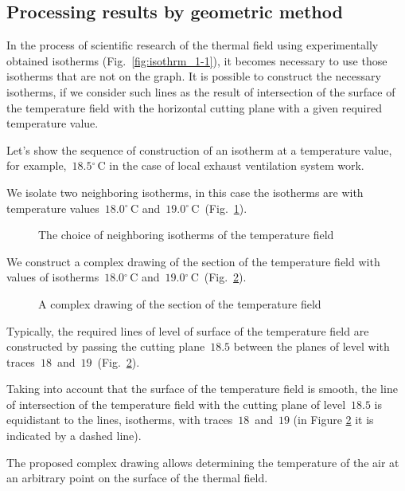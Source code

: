 \documentclass[12pt,twoside]{article}
\newcommand{\FigRef}[2][]{(Fig.~\ref{#2}\textit{#1})}
\newcommand{\degC}{{}^{\circ}\,\text{C}} %
\begin{document}
\begin{JGGarticle}
		\section{Processing results by geometric method}
			In the process of scientific research of the thermal field using experimentally obtained isotherms \FigRef{fig:isothrm_1-1}, it becomes necessary to use those isotherms that are not on the graph. It is possible to construct the necessary isotherms, if we consider such lines as the result of intersection of the surface of the temperature field with the horizontal cutting plane with a given required temperature value.
			
			Let's show the sequence of construction of an isotherm at a temperature value, for example,~$18.5\degC$ in the case of local exhaust ventilation system work.
			
			We isolate two neighboring isotherms, in this case the isotherms are with temperature values~$18.0\degC$ and~$19.0\degC$~\FigRef{fig:t_isothrm}.
			\begin{figure}[!hbt]
				\caption{The choice of neighboring isotherms of the temperature field}
				\label{fig:t_isothrm}
			\end{figure}
			We construct a complex drawing of the section of the temperature field with values of isotherms~$18.0\degC$ and~$19.0\degC$~\FigRef{fig:t_complex}.
			\begin{figure}[!hbt]
				\caption{A complex drawing of the section of the temperature field}
				\label{fig:t_complex}
			\end{figure}
			Typically, the required lines of level of surface of the temperature field are constructed by passing the cutting plane~$18.5$ between the planes of level with traces~$18$~and~$19$~\FigRef{fig:t_complex}.
			
			Taking into account that the surface of the temperature field is smooth, the line of intersection of the temperature field with the cutting plane of level~$18.5$ is equidistant to the lines, isotherms, with traces~$18$~and~$19$ (in Figure \ref{fig:t_complex} it is indicated by a dashed line).
			
			The proposed complex drawing allows determining the temperature of the air at an arbitrary point on the surface of the thermal field.
			

\end{JGGarticle}
\end{document}
